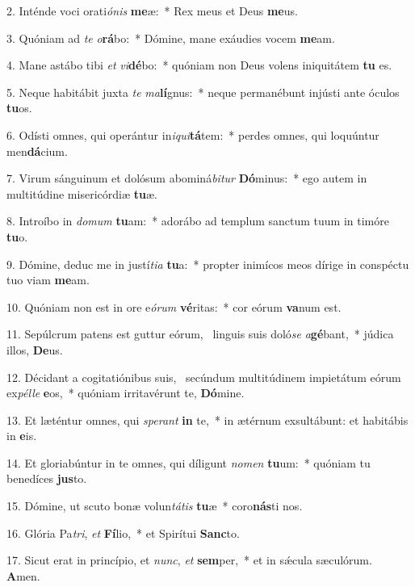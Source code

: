 2. Inténde voci orati\textit{ó}\textit{nis} \textbf{me}æ:~*  Rex meus et Deus \textbf{me}us.\

3. Quóniam ad \textit{te} \textit{o}\textbf{rá}bo:~*  Dómine, mane exáudies vocem \textbf{me}am.\

4. Mane astábo tibi \textit{et} \textit{vi}\textbf{dé}bo:~*  quóniam non Deus volens iniquitátem \textbf{tu} es.\

5. Neque habitábit juxta \textit{te} \textit{ma}\textbf{lí}gnus:~*  neque permanébunt injústi ante óculos \textbf{tu}os.\

6. Odísti omnes, qui operántur in\textit{i}\textit{qui}\textbf{tá}tem:~*  perdes omnes, qui loquúntur men\textbf{dá}cium.\

7. Virum sánguinum et dolósum abominá\textit{bi}\textit{tur} \textbf{Dó}minus:~*  ego autem in multitúdine misericórdiæ \textbf{tu}æ.\

8. Introíbo in \textit{do}\textit{mum} \textbf{tu}am:~*  adorábo ad templum sanctum tuum in timóre \textbf{tu}o.\

9. Dómine, deduc me in justí\textit{ti}\textit{a} \textbf{tu}a:~*  propter inimícos meos dírige in conspéctu tuo viam \textbf{me}am.\

10. Quóniam non est in ore e\textit{ó}\textit{rum} \textbf{vé}ritas:~*  cor eórum \textbf{va}num est.\

11. Sepúlcrum patens est guttur eórum, \dag\  linguis suis doló\textit{se} \textit{a}\textbf{gé}bant,~*  júdica illos, \textbf{De}us.\

12. Décidant a cogitatiónibus suis, \dag\  secúndum multitúdinem impietátum eórum ex\textit{pél}\textit{le} \textbf{e}os,~*  quóniam irritavérunt te, \textbf{Dó}mine.\

13. Et læténtur omnes, qui \textit{spe}\textit{rant} \textbf{in} te,~*  in ætérnum exsultábunt: et habitábis in \textbf{e}is.\

14. Et gloriabúntur in te omnes, qui díligunt \textit{no}\textit{men} \textbf{tu}um:~*  quóniam tu benedíces \textbf{jus}to.\

15. Dómine, ut scuto bonæ volun\textit{tá}\textit{tis} \textbf{tu}æ~*  coro\textbf{nás}ti nos.\

16. Glória Pa\textit{tri}, \textit{et} \textbf{Fí}lio,~*  et Spirítui \textbf{Sanc}to.\

17. Sicut erat in princípio, et \textit{nunc}, \textit{et} \textbf{sem}per,~*  et in sǽcula sæculórum. \textbf{A}men.\

